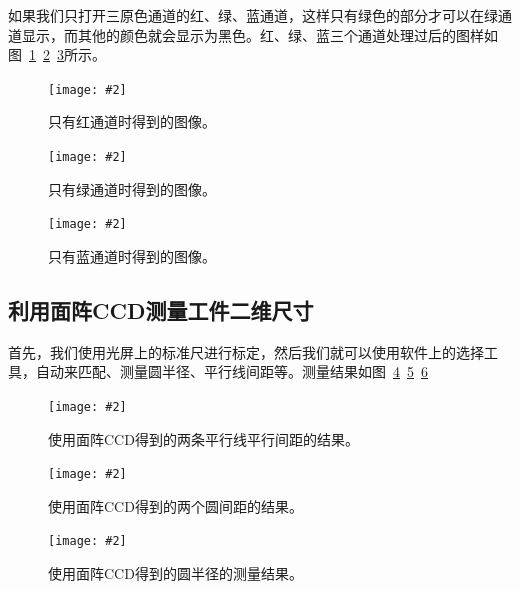 \documentclass{ctexart}
\newcommand{\cpic}[2]{
\begin{center}
\texttt{[image: \#2]}
\end{center}
}
\newcommand{\cpicn}[3]
{
\begin{figure}[H]
\cpic{#1}{#2}
\caption{#3\label{#2}}
\end{figure}
}
\begin{document}
如果我们只打开三原色通道的红、绿、蓝通道，这样只有绿色的部分才可以在绿通道显示，而其他的颜色就会显示为黑色。红、绿、蓝三个通道处理过后的图样如图~\ref{CCD/红通道}~\ref{CCD/绿通道}~\ref{CCD/蓝通道}所示。
\cpicn{0.5}{CCD/红通道}{只有红通道时得到的图像。}
\cpicn{0.5}{CCD/绿通道}{只有绿通道时得到的图像。}
\cpicn{0.5}{CCD/蓝通道}{只有蓝通道时得到的图像。}

\subsection{利用面阵CCD测量工件二维尺寸}
首先，我们使用光屏上的标准尺进行标定，然后我们就可以使用软件上的选择工具，自动来匹配、测量圆半径、平行线间距等。测量结果如图~\ref{CCD/平行间距}~\ref{CCD/圆间距}~\ref{CCD/圆半径}
\cpicn{0.5}{CCD/平行间距}{使用面阵CCD得到的两条平行线平行间距的结果。}
\cpicn{0.5}{CCD/圆间距}{使用面阵CCD得到的两个圆间距的结果。}
\cpicn{0.5}{CCD/圆半径}{使用面阵CCD得到的圆半径的测量结果。}
\end{document}
